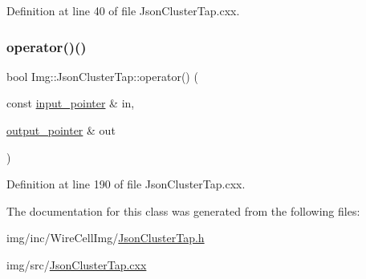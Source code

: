 Definition at line 40 of file Json\+Cluster\+Tap.\+cxx.

\mbox{\label{class_wire_cell_1_1_img_1_1_json_cluster_tap_ad1b29dc57145adf2c3b9100a1ee96e56}} 
\subsubsection{\texorpdfstring{operator()()}{operator()()}}
{\footnotesize\ttfamily bool Img\+::\+Json\+Cluster\+Tap\+::operator() (\begin{DoxyParamCaption}\item[{const \hyperlink{class_wire_cell_1_1_i_function_node_a55c0946156df9b712b8ad1a0b59b2db6}{input\+\_\+pointer} \&}]{in,  }\item[{\hyperlink{class_wire_cell_1_1_i_function_node_afc02f1ec60d31aacddf64963f9ca650b}{output\+\_\+pointer} \&}]{out }\end{DoxyParamCaption})\hspace{0.3cm}{\ttfamily [virtual]}}



Definition at line 190 of file Json\+Cluster\+Tap.\+cxx.



The documentation for this class was generated from the following files\+:\begin{DoxyCompactItemize}
\item 
img/inc/\+Wire\+Cell\+Img/\hyperlink{_json_cluster_tap_8h}{Json\+Cluster\+Tap.\+h}\item 
img/src/\hyperlink{_json_cluster_tap_8cxx}{Json\+Cluster\+Tap.\+cxx}\end{DoxyCompactItemize}
